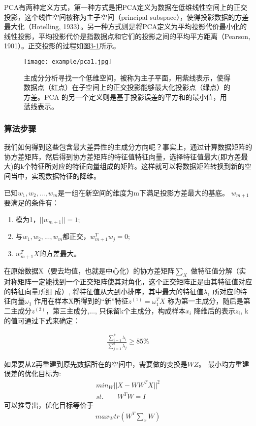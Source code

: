 PCA有两种定义方式，第一种方式是把PCA定义为数据在低维线性空间上的正交投影，这个线性空间被称为主子空间（principal subspace），使得投影数据的方差最大化（Hotelling, 1933）。另一种方式则是将PCA定义为平均投影代价最小化的线性投影，平均投影代价是指数据点和它们的投影之间的平均平方距离（Pearson, 1901）。正交投影的过程如图\href{fig:3-1}{3-1}所示。

\begin{figure}[!htp]
\centering
\texttt{[image: example/pca1.jpg]}
\caption{主成分分析寻找一个低维空间，被称为主子平面，用紫线表示，使得数据点（红点）在子空间上的正交投影能够最大化投影点（绿点）的方差。PCA 的另一个定义则是基于投影误差的平方和的最小值，用蓝线表示。}
\label{fig1:3-1}
\end{figure}

\subsubsection{算法步骤}

我们如何得到这些包含最大差异性的主成分方向呢？事实上，通过计算数据矩阵的协方差矩阵，然后得到协方差矩阵的特征值特征向量，选择特征值最大(即方差最大)的k个特征所对应的特征向量组成的矩阵。这样就可以将数据矩阵转换到新的空间当中，实现数据特征的降维。

已知$w_1, w_2, ... , w_m$是一组在新空间的维度为m下满足投影方差最大的基底。
$w_{m+1}$要满足的条件有：
\begin{enumerate}[label=\circled{\arabic*}]
    \item 模为1，$||w_{m+1}||= 1$;
    \item 与$w_1, w_2,..., w_m$都正交，$w^T_{m+1}w_j = 0$;
    \item $w^T_{m+1}X$的方差最大。
\end{enumerate}

在原始数据X（要去均值，也就是中心化）的协方差矩阵$\sum_X$ 做特征值分解（实对称矩阵一定能找到一个正交矩阵使其对角化，这个正交矩阵正是由其特征值对应的特征向量所组
成）, 将特征值从大到小排序，其中最大的特征值$\lambda_1$ 所对应的特征向量$\omega_1$ 作用在样本X所得到的“新”特征$z^{(1)} = \omega_1^T X$ 称为第一主成分，随后是第二主成分$z^{(2)}$，第三主成分,..., 只保留k个主成分，构成样本$x_i$ 降维后的表示$z_i$, k的值可通过下式来确定：

\begin{eqnarray}
\frac{\sum_{i = 1}^k \lambda_i}{\sum_{j = 1}^d \lambda_j} \geq 85 \%
\end{eqnarray}

如果要从Z再重建到原先数据所在的空间中，需要做的变换是$WZ$。 最小均方重建误差的优化目标为:
\begin{align}
min_{W} ||X - WW^TX||^2 \\
st. \quad \quad W^TW = I
\end{align}
可以推导出，优化目标等价于
\begin{eqnarray}
max_W tr(W^T\sum_xW)
\end{eqnarray}


